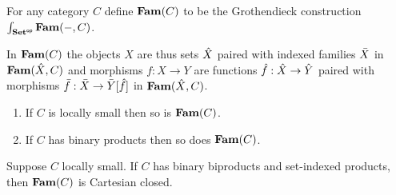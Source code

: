 \begin{definition}
For any category $C$ define $\mathbf{Fam}(C)$ to be the Grothendieck construction
$\int_{\mathbf{Set}^{\mathsf{op}}}\mathbf{Fam}(-,C)$.
\end{definition}

\noindent In $\mathbf{Fam}(C)$ the objects $X$ are thus sets $\hat{X}$ paired with indexed families $\bar{X}$ in
$\mathbf{Fam}(\hat{X},C)$ and morphisms $f: X \to Y$ are functions $\hat{f}: \hat{X} \to \hat{Y}$ paired with
morphisms $\bar{f}: \bar{X} \to \bar{Y}[\hat{f}]$ in $\mathbf{Fam}(\hat{X},C)$.

\begin{proposition}
\item
\begin{enumerate}
\item If $C$ is locally small then so is $\mathbf{Fam}(C)$.
\item If $C$ has binary products then so does $\mathbf{Fam}(C)$.
\end{enumerate}
\end{proposition}

\begin{proposition}
Suppose $C$ locally small. If $C$ has binary biproducts and set-indexed products, then $\mathbf{Fam}(C)$ is Cartesian
closed. 
\end{proposition}

